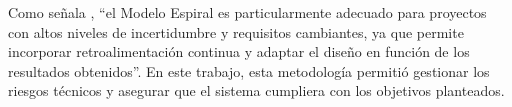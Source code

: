 Como señala \citeauthor{boehm_spiral_1988} \citeyear{boehm_spiral_1988}, ``el Modelo Espiral es particularmente adecuado para proyectos con altos niveles de incertidumbre y requisitos cambiantes, ya que permite incorporar retroalimentación continua y adaptar el diseño en función de los resultados obtenidos”. En este trabajo, esta metodología permitió gestionar los riesgos técnicos y asegurar que el sistema cumpliera con los objetivos planteados.


